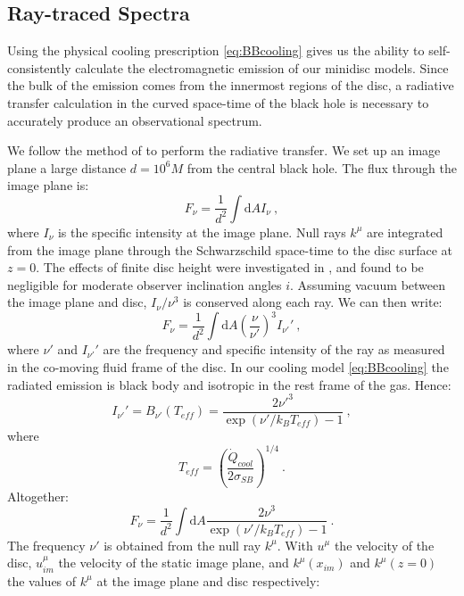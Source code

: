 \documentclass{emulateapj}
\newcommand{\sig}{\sigma}
\newcommand{\dd}{\mbox{d}}
\begin{document}
\subsection{Ray-traced Spectra}
\label{subsec:raySpec}

Using the physical cooling prescription \eqref{eq:BBcooling} gives us the ability to self-consistently calculate the electromagnetic emission of our minidisc models.  Since the bulk of the emission comes from the innermost regions of the disc, a radiative transfer calculation in the curved space-time of the black hole is necessary to accurately produce an observational spectrum.

We follow the method of \cite{Kulkarni11, Zhu12} to perform the radiative transfer.  We set up an image plane a large distance $d = 10^6 M$ from the central black hole.  The flux through the image plane is:
\begin{equation}
	F_\nu = \frac{1}{d^2} \int \dd A I_\nu \ ,
\end{equation}
where $I_\nu$ is the specific intensity at the image plane.  Null rays $k^\mu$ are integrated from the image plane through the Schwarzschild space-time to the disc surface at $z=0$.  The effects of finite disc height were investigated in \cite{Kulkarni11}, and found to be negligible %
for moderate observer inclination angles $i$. Assuming vacuum between the image plane and disc, $I_\nu / \nu^3$ is conserved along each ray.  We can then write:
\begin{equation}
	F_\nu = \frac{1}{d^2} \int \dd A \left( \frac{\nu}{\nu'} \right)^3 I_{\nu'}' \ ,
\end{equation}
where $\nu'$ and $I_{\nu'}'$ are the frequency and specific intensity of the ray as measured in the co-moving fluid frame of the disc. In our cooling model \eqref{eq:BBcooling} the radiated emission is black body and isotropic in the rest frame of the gas.  Hence:
\begin{equation}
	I_{\nu'}' = B_{\nu '} (T_{eff}) = \frac{2 {\nu'}^3}{\exp\left(\nu' / k_B T_{eff}\right) - 1}\ ,
\end{equation}
where
\begin{equation}
	T_{eff} = \left(\frac{\dot{Q}_{cool}}{2 \sig_{SB}} \right)^{1/4} \ .
\end{equation}
Altogether:
\begin{equation}
	F_{\nu} = \frac{1}{d^2} \int \dd A \frac{2 \nu^3}{\exp\left(\nu' / k_B T_{eff}\right) - 1} \ .
\end{equation}
The frequency $\nu'$ is obtained from the null ray $k^\mu$.  With $u^\mu$ the velocity of the disc, $u_{im}^\mu$ the velocity of the static image plane, and $k^\mu(x_{im})$ and $k^\mu(z=0)$ the values of $k^\mu$ at the image plane and disc respectively:
\end{document}

